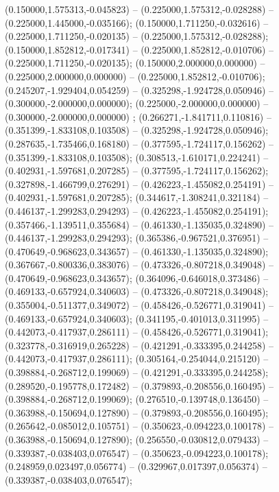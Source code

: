  (0.150000,1.575313,-0.045823) -- (0.225000,1.575312,-0.028288) -- (0.225000,1.445000,-0.035166);
 (0.150000,1.711250,-0.032616) -- (0.225000,1.711250,-0.020135) -- (0.225000,1.575312,-0.028288);
 (0.150000,1.852812,-0.017341) -- (0.225000,1.852812,-0.010706) -- (0.225000,1.711250,-0.020135);
 (0.150000,2.000000,0.000000) -- (0.225000,2.000000,0.000000) -- (0.225000,1.852812,-0.010706);
 (0.245207,-1.929404,0.054259) -- (0.325298,-1.924728,0.050946) -- (0.300000,-2.000000,0.000000);
 (0.225000,-2.000000,0.000000) -- (0.300000,-2.000000,0.000000) ;
 (0.266271,-1.841711,0.110816) -- (0.351399,-1.833108,0.103508) -- (0.325298,-1.924728,0.050946);
 (0.287635,-1.735466,0.168180) -- (0.377595,-1.724117,0.156262) -- (0.351399,-1.833108,0.103508);
 (0.308513,-1.610171,0.224241) -- (0.402931,-1.597681,0.207285) -- (0.377595,-1.724117,0.156262);
 (0.327898,-1.466799,0.276291) -- (0.426223,-1.455082,0.254191) -- (0.402931,-1.597681,0.207285);
 (0.344617,-1.308241,0.321184) -- (0.446137,-1.299283,0.294293) -- (0.426223,-1.455082,0.254191);
 (0.357466,-1.139511,0.355684) -- (0.461330,-1.135035,0.324890) -- (0.446137,-1.299283,0.294293);
 (0.365386,-0.967521,0.376951) -- (0.470649,-0.968623,0.343657) -- (0.461330,-1.135035,0.324890);
 (0.367667,-0.800336,0.383076) -- (0.473326,-0.807218,0.349048) -- (0.470649,-0.968623,0.343657);
 (0.364096,-0.646018,0.373486) -- (0.469133,-0.657924,0.340603) -- (0.473326,-0.807218,0.349048);
 (0.355004,-0.511377,0.349072) -- (0.458426,-0.526771,0.319041) -- (0.469133,-0.657924,0.340603);
 (0.341195,-0.401013,0.311995) -- (0.442073,-0.417937,0.286111) -- (0.458426,-0.526771,0.319041);
 (0.323778,-0.316919,0.265228) -- (0.421291,-0.333395,0.244258) -- (0.442073,-0.417937,0.286111);
 (0.305164,-0.254044,0.215120) -- (0.398884,-0.268712,0.199069) -- (0.421291,-0.333395,0.244258);
 (0.289520,-0.195778,0.172482) -- (0.379893,-0.208556,0.160495) -- (0.398884,-0.268712,0.199069);
 (0.276510,-0.139748,0.136450) -- (0.363988,-0.150694,0.127890) -- (0.379893,-0.208556,0.160495);
 (0.265642,-0.085012,0.105751) -- (0.350623,-0.094223,0.100178) -- (0.363988,-0.150694,0.127890);
 (0.256550,-0.030812,0.079433) -- (0.339387,-0.038403,0.076547) -- (0.350623,-0.094223,0.100178);
 (0.248959,0.023497,0.056774) -- (0.329967,0.017397,0.056374) -- (0.339387,-0.038403,0.076547);
